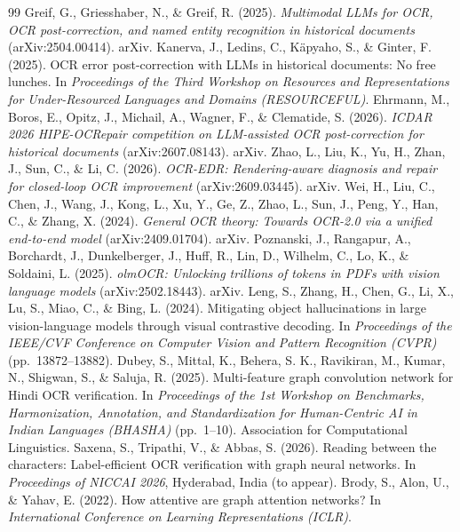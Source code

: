 \begin{thebibliography}{99}
 Greif, G., Griesshaber, N., \& Greif, R. (2025). \textit{Multimodal LLMs for OCR, OCR post-correction, and named entity recognition in historical documents} (arXiv:2504.00414). arXiv.
 Kanerva, J., Ledins, C., K\"apyaho, S., \& Ginter, F. (2025). OCR error post-correction with LLMs in historical documents: No free lunches. In \textit{Proceedings of the Third Workshop on Resources and Representations for Under-Resourced Languages and Domains (RESOURCEFUL)}.
 Ehrmann, M., Boros, E., Opitz, J., Michail, A., Wagner, F., \& Clematide, S. (2026). \textit{ICDAR 2026 HIPE-OCRepair competition on LLM-assisted OCR post-correction for historical documents} (arXiv:2607.08143). arXiv.
 Zhao, L., Liu, K., Yu, H., Zhan, J., Sun, C., \& Li, C. (2026). \textit{OCR-EDR: Rendering-aware diagnosis and repair for closed-loop OCR improvement} (arXiv:2609.03445). arXiv.
 Wei, H., Liu, C., Chen, J., Wang, J., Kong, L., Xu, Y., Ge, Z., Zhao, L., Sun, J., Peng, Y., Han, C., \& Zhang, X. (2024). \textit{General OCR theory: Towards OCR-2.0 via a unified end-to-end model} (arXiv:2409.01704). arXiv.
 Poznanski, J., Rangapur, A., Borchardt, J., Dunkelberger, J., Huff, R., Lin, D., Wilhelm, C., Lo, K., \& Soldaini, L. (2025). \textit{olmOCR: Unlocking trillions of tokens in PDFs with vision language models} (arXiv:2502.18443). arXiv.
 Leng, S., Zhang, H., Chen, G., Li, X., Lu, S., Miao, C., \& Bing, L. (2024). Mitigating object hallucinations in large vision-language models through visual contrastive decoding. In \textit{Proceedings of the IEEE/CVF Conference on Computer Vision and Pattern Recognition (CVPR)} (pp.~13872--13882).
 Dubey, S., Mittal, K., Behera, S. K., Ravikiran, M., Kumar, N., Shigwan, S., \& Saluja, R. (2025). Multi-feature graph convolution network for Hindi OCR verification. In \textit{Proceedings of the 1st Workshop on Benchmarks, Harmonization, Annotation, and Standardization for Human-Centric AI in Indian Languages (BHASHA)} (pp.~1--10). Association for Computational Linguistics.
 Saxena, S., Tripathi, V., \& Abbas, S. (2026). Reading between the characters: Label-efficient OCR verification with graph neural networks. In \textit{Proceedings of NICCAI 2026}, Hyderabad, India (to appear).
 Brody, S., Alon, U., \& Yahav, E. (2022). How attentive are graph attention networks? In \textit{International Conference on Learning Representations (ICLR)}.

\end{thebibliography}

